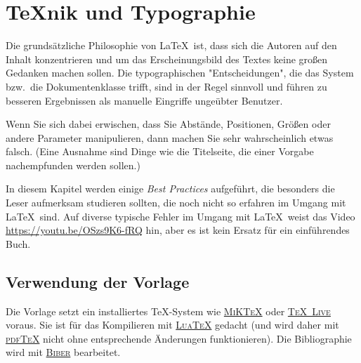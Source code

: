 \chapter{{\TeX}nik und Typographie}\label{ch-tech}

Die grundsätzliche Philosophie von \LaTeX\ ist, dass sich die Autoren auf den
Inhalt konzentrieren und um das Erscheinungsbild des Textes keine großen
Gedanken machen sollen.  Die typographischen "Entscheidungen", die das System
bzw.\ die Dokumentenklasse trifft, sind in der Regel sinnvoll und führen zu
besseren Ergebnissen als manuelle Eingriffe ungeübter Benutzer.

Wenn Sie sich dabei erwischen, dass Sie Abstände, Positionen, Größen oder
andere Parameter manipulieren, dann machen Sie sehr wahrscheinlich etwas
falsch.  (Eine Ausnahme sind Dinge wie die Titelseite, die einer Vorgabe
nachempfunden werden sollen.)

In diesem Kapitel werden einige \textit{Best Practices} aufgeführt, die
besonders die Leser aufmerksam studieren sollten, die noch nicht so erfahren
im Umgang mit \LaTeX\ sind.  Auf diverse typische Fehler im Umgang mit \LaTeX\
weist das Video \url{https://youtu.be/OSzs9K6-fRQ} hin, aber es ist kein
Ersatz für ein einführendes Buch.

\section{Verwendung der Vorlage}

Die Vorlage setzt ein installiertes \TeX-System wie
\href{https://de.wikipedia.org/wiki/MiKTeX}{\textsc{MiK\TeX}} oder
\href{https://de.wikipedia.org/wiki/TeX_Live}{\textsc{\TeX\ Live}} voraus.
Sie ist für das Kompilieren mit
\href{https://de.wikipedia.org/wiki/LuaTeX}{\textsc{Lua\TeX}} gedacht (und
wird daher mit \href{https://de.wikipedia.org/wiki/PdfTeX}{\textsc{pdf\TeX}}
nicht ohne entsprechende Änderungen funktionieren).  Die Bibliographie wird
mit \href{https://en.wikipedia.org/wiki/Biber_(LaTeX)}{\textsc{Biber}}
bearbeitet.

